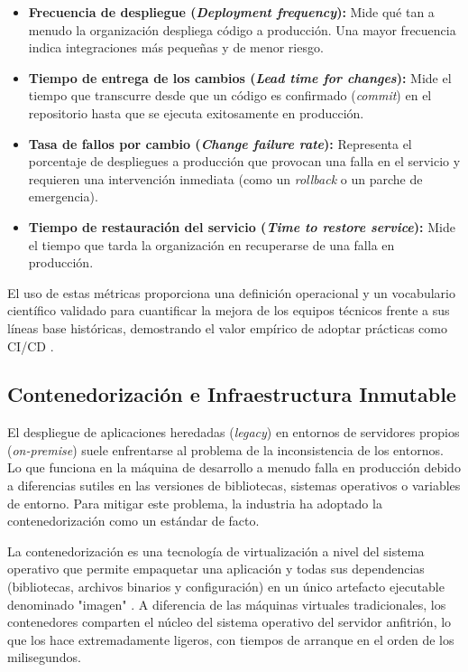 \begin{itemize}
  \item \textbf{Frecuencia de despliegue (\emph{Deployment frequency}):} Mide qué tan a menudo la
  organización despliega código a producción. Una mayor frecuencia indica integraciones más pequeñas
  y de menor riesgo.

  \item \textbf{Tiempo de entrega de los cambios (\emph{Lead time for changes}):} Mide el tiempo que
  transcurre desde que un código es confirmado (\emph{commit}) en el repositorio hasta que se ejecuta
  exitosamente en producción.

  \item \textbf{Tasa de fallos por cambio (\emph{Change failure rate}):} Representa el porcentaje de
  despliegues a producción que provocan una falla en el servicio y requieren una intervención inmediata
  (como un \emph{rollback} o un parche de emergencia).

  \item \textbf{Tiempo de restauración del servicio (\emph{Time to restore service}):} Mide el tiempo
  que tarda la organización en recuperarse de una falla en producción.
\end{itemize}

El uso de estas métricas proporciona una definición operacional y un vocabulario científico 
validado para cuantificar la mejora de los equipos técnicos frente a sus líneas base históricas, 
demostrando el valor empírico de adoptar prácticas como CI/CD \cite{Forsgren2018}.

\subsection{Contenedorización e Infraestructura Inmutable}
El despliegue de aplicaciones heredadas (\emph{legacy}) en entornos de servidores propios 
(\emph{on-premise}) suele enfrentarse al problema de la inconsistencia de los entornos. 
Lo que funciona en la máquina de desarrollo a menudo falla en producción debido a diferencias 
sutiles en las versiones de bibliotecas, sistemas operativos o variables de entorno. Para mitigar 
este problema, la industria ha adoptado la contenedorización como un estándar de facto.

La contenedorización es una tecnología de virtualización a nivel del sistema operativo que permite 
empaquetar una aplicación y todas sus dependencias (bibliotecas, archivos binarios y configuración) 
en un único artefacto ejecutable denominado "imagen" \cite{Taibi2022}. A diferencia de las máquinas 
virtuales tradicionales, los contenedores comparten el núcleo del sistema operativo del servidor 
anfitrión, lo que los hace extremadamente ligeros, con tiempos de arranque en el orden de los milisegundos.

